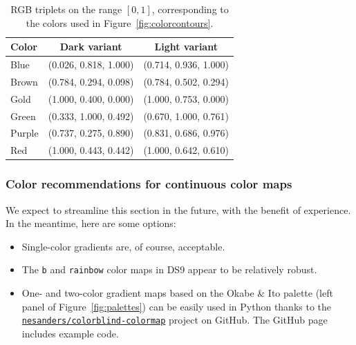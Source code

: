 \documentclass[letterpaper,11pt]{article}
\begin{document}
\begin{table}
  \begin{center}
    \caption{
      RGB triplets on the range $[0,1]$, corresponding to the colors used in Figure~\ref{fig:colorcontours}.
    }
    \label{tab:colorpairs}
    \vspace{-1ex}
    \begin{tabular}{lcc}
      \hline
      Color & Dark variant & Light variant \\
      \hline
      Blue & (0.026, 0.818, 1.000) & (0.714, 0.936, 1.000) \\
      Brown & (0.784, 0.294, 0.098) & (0.784, 0.502, 0.294) \\
      Gold & (1.000, 0.400, 0.000) & (1.000, 0.753, 0.000) \\
      Green & (0.333, 1.000, 0.492) & (0.670, 1.000, 0.761) \\
      Purple & (0.737, 0.275, 0.890) & (0.831, 0.686, 0.976) \\
      Red & (1.000, 0.443, 0.442) & (1.000, 0.642, 0.610) \\
      \hline
   \end{tabular}
  \end{center}
\end{table} 


\subsubsection{Color recommendations for continuous color maps} \label{sec:colormaps}

We expect to streamline this section in the future, with the benefit of experience. In the meantime, here are some options:
\begin{itemize}
\item Single-color gradients are, of course, acceptable.
\item The {\tt b} and {\tt rainbow} color maps in DS9 appear to be relatively robust.
\item One- and two-color gradient maps based on the Okabe \& Ito palette (left panel of Figure~\ref{fig:palettes}) can be easily used in Python thanks to the \href{https://github.com/nesanders/colorblind-colormap}{\tt nesanders/colorblind-colormap} project on GitHub. The GitHub page includes example code.
\end{itemize}

\end{document}
